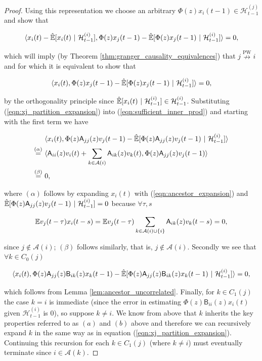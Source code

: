\documentclass[12pt]{article}
\def\npwgc{\overset{\text{PW}}{\nrightarrow}}  %
\def\B{\mathsf{B}}  %
\def\A{\mathsf{A}}  %
\def\H{\mathcal{H}}  %
\newcommand{\linE}[2]{\hat{\E}[#1\ |\ #2]}  %
\newcommand{\anc}[1]{\mathcal{A}(#1)}  %
\begin{document}
\begin{proof}
  Using this representation we choose an arbitrary $\Phi(z) x_i(t - 1) \in \H_{t - 1}^{(j)}$ and show that

  \begin{equation}
    \inner{x_i(t) - \linE{x_i(t)}{\H_{t - 1}^{(i)}}}{\Phi(z)x_j(t - 1) - \linE{\Phi(z)x_j(t - 1)}{\H_{t - 1}^{(i)}}} = 0,
  \end{equation}

  which will imply (by Theorem \ref{thm:granger_causality_equivalences}) that $j \npwgc i$ and for which it is equivalent to show that

  \begin{equation}
    \label{eqn:sufficient_inner_prod}
    \inner{x_i(t)}{\Phi(z)x_j(t - 1) - \linE{\Phi(z)x_j(t - 1)}{\H_{t - 1}^{(i)}}} = 0,
  \end{equation}

  by the orthogonality principle since $\linE{x_i(t)}{\H_{t - 1}^{(i)}} \in \H_{t - 1}^{(i)}$.  Substituting (\ref{eqn:xj_partition_expansion}) into (\ref{eqn:sufficient_inner_prod}) and starting with the first term we have

  \begin{align*}
    &\inner{x_i(t)}{\Phi(z)\A_{jj}(z)v_j(t - 1) - \linE{\Phi(z)\A_{jj}(z)v_j(t - 1)}{\H_{t - 1}^{(i)}}}\\
    \overset{(\alpha)}{=}\ &\inner{\A_{ii}(z)v_i(t) + \sum_{k \in \anc{i}}\A_{ik}(z)v_k(t)}{\Phi(z)\A_{jj}(z)v_j(t - 1)}\\
    \overset{(\beta)}{=}\ &0,
  \end{align*}

  where $(\alpha)$ follows by expanding $x_i(t)$ with (\ref{eqn:ancestor_expansion}) and $\linE{\Phi(z)\A_{jj}(z)v_j(t - 1)}{\H_{t - 1}^{(i)}} = 0$ because $\forall \tau, s$

  \begin{equation*}
    \E v_j(t - \tau) x_i(t - s) = \E v_j(t - \tau) \sum_{k \in \anc{i} \cup \{i\}}\A_{ik}(z)v_k(t - s) = 0,
  \end{equation*}

  since $j \not \in \anc{i}$; $(\beta)$ follows similarly, that is, $j \not \in \anc{i}$.  Secondly we see that $\forall k \in C_0(j)$

  \begin{equation*}
    \inner{x_i(t)}{\Phi(z)\A_{jj}(z)\B_{ik}(z)x_k(t - 1) - \linE{\Phi(z)\A_{jj}(z)\B_{ik}(z)x_k(t - 1)}{\H_{t - 1}^{(i)}}} = 0,
  \end{equation*}

  which follows from Lemma \ref{lem:ancestor_uncorrelated}.  Finally,
  for $k \in C_1(j)$ the case $k = i$ is immediate (since the error in
  estimating $\Phi(z)\B_{ii}(z)x_i(t)$ given $\H_{t - 1}^{(i)}$ is
  $0$), so suppose $k \ne i$.  We know from above that $k$ inherits the
  key properties referred to as $(a)$ and $(b)$ above and therefore we
  can recursively expand $k$ in the same way as in equation
  (\ref{eqn:xj_partition_expansion}).  Continuing this recursion for
  each $k \in C_1(j)$ (where $k \ne i$) must eventually terminate since
  $i \in \anc{k}$.
\end{proof}
\end{document}
